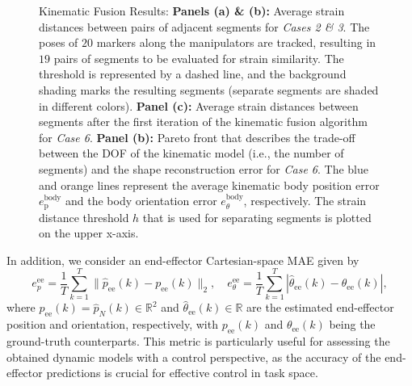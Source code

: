 \begin{figure}[ht]
    \caption{
    Kinematic Fusion Results:
    \textbf{Panels (a) \& (b):} Average strain distances between pairs of adjacent segments for \emph{Cases 2 \& 3}. The poses of $20$ markers along the manipulators are tracked, resulting in $19$ pairs of segments to be evaluated for strain similarity. The threshold is represented by a dashed line, and the background shading marks the resulting segments (separate segments are shaded in different colors).
    \textbf{Panel (c):} Average strain distances between segments after the first iteration of the kinematic fusion algorithm for \emph{Case 6}. \textbf{Panel (b):} Pareto front that describes the trade-off between the DOF of the kinematic model (i.e., the number of segments) and the shape reconstruction error for \emph{Case 6}.
    The blue and orange lines represent the average kinematic body position error $e_\mathrm{p}^\mathrm{body}$ and the body orientation error $e_\theta^\mathrm{body}$, respectively.
    The strain distance threshold $h$ that is used for separating segments is plotted on the upper x-axis.
    }\label{fig:pcsregression:results:kinematic_fusion}
\end{figure}

In addition, we consider an end-effector Cartesian-space \gls{MAE} given by
\begin{equation}
    e_p^{\mathrm{ee}} = \frac{1}{ T} \sum_{k=1}^T \lVert \hat{p}_\mathrm{ee}(k) - p_\mathrm{ee}(k) \rVert_2,
    \quad
    e_{\theta}^{\mathrm{ee}}=\frac{1}{T} \sum_{k=1}^T | \hat{\theta}_\mathrm{ee}(k) - \theta_\mathrm{ee}(k) |,
\end{equation}
where $\hat{p}_\mathrm{ee}(k) = \hat{p}_{N}(k) \in \mathbb{R}^2$ and $\hat{\theta}_\mathrm{ee}(k) \in \mathbb{R}$ are the estimated end-effector position and orientation, respectively, with $p_\mathrm{ee}(k)$ and $\theta_\mathrm{ee}(k)$ being the ground-truth counterparts. 
This metric is particularly useful for assessing the obtained dynamic models with a control perspective, as the accuracy of the end-effector predictions is crucial for effective control in task space.

